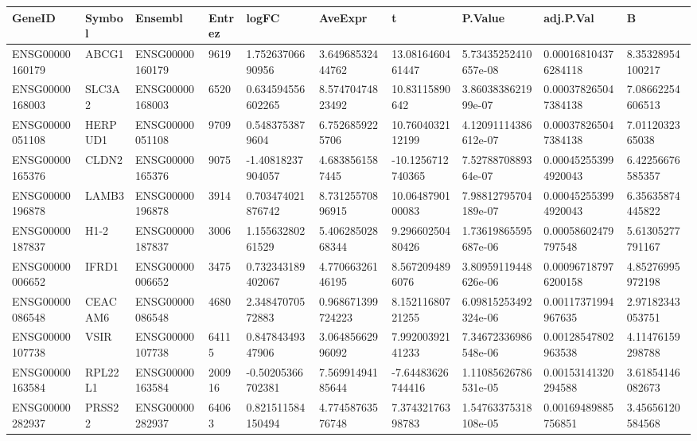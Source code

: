 \begingroup
\tiny
\setlength{\tabcolsep}{2pt}
\renewcommand{\arraystretch}{1.18}
\begin{tabular}{@{}llllllllll@{}}
\toprule
GeneID & Symbol & Ensembl & Entrez & logFC & AveExpr & t & P.Value & adj.P.Val & B \\
\midrule
ENSG00000160179 & ABCG1 & ENSG00000160179 & 9619 & 1.75263706690956 & 3.64968532444762 & 13.0816460461447 & 5.73435252410657e-08 & 0.000168104376284118 & 8.35328954100217 \\
ENSG00000168003 & SLC3A2 & ENSG00000168003 & 6520 & 0.634594556602265 & 8.57470474823492 & 10.83115890642 & 3.8603838621999e-07 & 0.000378265047384138 & 7.08662254606513 \\
ENSG00000051108 & HERPUD1 & ENSG00000051108 & 9709 & 0.5483753879604 & 6.7526859225706 & 10.7604032112199 & 4.12091114386612e-07 & 0.000378265047384138 & 7.0112032365038 \\
ENSG00000165376 & CLDN2 & ENSG00000165376 & 9075 & -1.40818237904057 & 4.6838561587445 & -10.1256712740365 & 7.5278870889364e-07 & 0.000452553994920043 & 6.42256676585357 \\
ENSG00000196878 & LAMB3 & ENSG00000196878 & 3914 & 0.703474021876742 & 8.73125570896915 & 10.0648790100083 & 7.98812795704189e-07 & 0.000452553994920043 & 6.35635874445822 \\
ENSG00000187837 & H1-2 & ENSG00000187837 & 3006 & 1.15563280261529 & 5.40628502868344 & 9.29660250480426 & 1.73619865595687e-06 & 0.00058602479797548 & 5.61305277791167 \\
ENSG00000006652 & IFRD1 & ENSG00000006652 & 3475 & 0.732343189402067 & 4.77066326146195 & 8.5672094896076 & 3.80959119448626e-06 & 0.000967187976200158 & 4.85276995972198 \\
ENSG00000086548 & CEACAM6 & ENSG00000086548 & 4680 & 2.34847070572883 & 0.968671399724223 & 8.15211680721255 & 6.09815253492324e-06 & 0.00117371994967635 & 2.97182343053751 \\
ENSG00000107738 & VSIR & ENSG00000107738 & 64115 & 0.84784349347906 & 3.06485662996092 & 7.99200392141233 & 7.34672336986548e-06 & 0.00128547802963538 & 4.11476159298788 \\
ENSG00000163584 & RPL22L1 & ENSG00000163584 & 200916 & -0.50205366702381 & 7.56991494185644 & -7.64483626744416 & 1.11085626786531e-05 & 0.00153141320294588 & 3.61854146082673 \\
ENSG00000282937 & PRSS22 & ENSG00000282937 & 64063 & 0.821511584150494 & 4.77458763576748 & 7.37432176398783 & 1.54763375318108e-05 & 0.00169489885756851 & 3.45656120584568 \\

\end{tabular}
